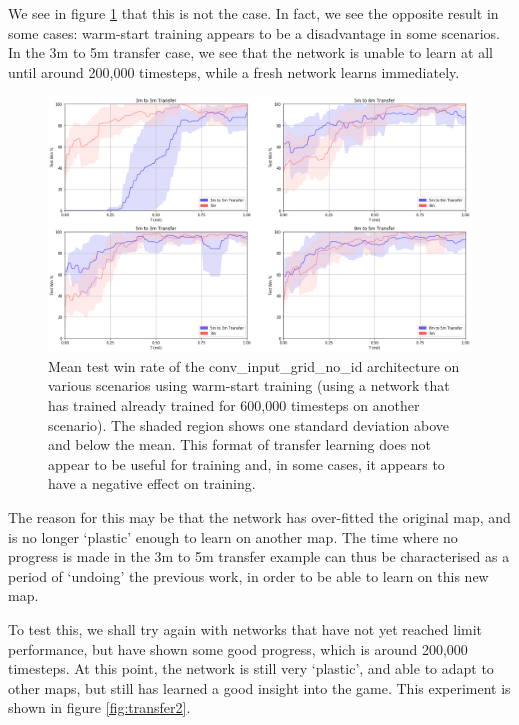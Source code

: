We see in figure \ref{fig:transfer6} that this is not the case. In fact, we see the opposite result in some cases: warm-start training appears to be a disadvantage in some scenarios. In the 3m to 5m transfer case, we see that the network is unable to learn at all until around 200,000 timesteps, while a fresh network learns immediately.

\begin{figure}[h]
    \centering
    \hbox{\hspace{-5em}\includegraphics[width=1.2\textwidth]{images/graphs/6.png}}
    \caption{Mean test win rate of the conv\_input\_grid\_no\_id architecture on various scenarios using warm-start training (using a network that has trained already trained for 600,000 timesteps on another scenario). The shaded region shows one standard deviation above and below the mean. This format of transfer learning does not appear to be useful for training and, in some cases, it appears to have a negative effect on training. }
    \label{fig:transfer6}
\end{figure}


The reason for this may be that the network has over-fitted the original map, and is no longer `plastic' enough to learn on another map. The time where no progress is made in the 3m to 5m transfer example can thus be characterised as a period of `undoing' the previous work, in order to be able to learn on this new map.

To test this, we shall try again with networks that have not yet reached limit performance, but have shown some good progress, which is around 200,000 timesteps. At this point, the network is still very `plastic', and able to adapt to other maps, but still has learned a good insight into the game. This experiment is shown in figure \ref{fig:transfer2}.


